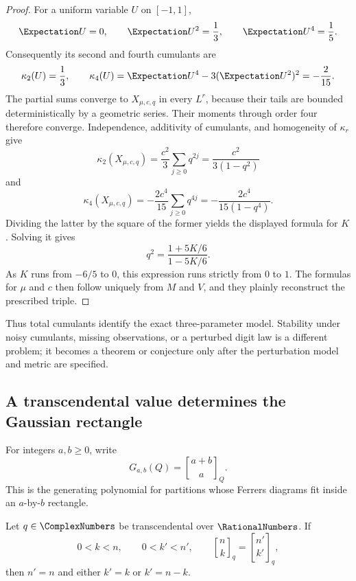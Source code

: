\begin{proof}
For a uniform variable \(U\) on \([-1,1]\),
\[
 \Expectation U=0,\qquad
 \Expectation U^2=\frac13,\qquad
 \Expectation U^4=\frac15.
\]
Consequently its second and fourth cumulants are
\[
 \kappa_2(U)=\frac13,\qquad
 \kappa_4(U)=\Expectation U^4-3(\Expectation U^2)^2=-\frac{2}{15}.
\]
The partial sums converge to \(X_{\mu,c,q}\) in every \(L^r\), because their
tails are bounded deterministically by a geometric series.  Their moments
through order four therefore converge.  Independence, additivity of
cumulants, and homogeneity of \(\kappa_r\) give
\[
 \kappa_2(X_{\mu,c,q})
  =\frac{c^2}{3}\sum_{j\ge0}q^{2j}
  =\frac{c^2}{3(1-q^2)}
\]
and
\[
 \kappa_4(X_{\mu,c,q})
  =-\frac{2c^4}{15}\sum_{j\ge0}q^{4j}
  =-\frac{2c^4}{15(1-q^4)}.
\]
Dividing the latter by the square of the former yields the displayed formula
for \(K\).  Solving it gives
\[
 q^2=\frac{1+5K/6}{1-5K/6}.
\]
As \(K\) runs from \(-6/5\) to \(0\), this expression runs strictly from
\(0\) to \(1\).  The formulas for \(\mu\) and \(c\) then follow uniquely from
\(M\) and \(V\), and they plainly reconstruct the prescribed triple.
\end{proof}

Thus total cumulants identify the exact three-parameter model.  Stability
under noisy cumulants, missing observations, or a perturbed digit law is a
different problem; it becomes a theorem or conjecture only after the
perturbation model and metric are specified.

\subsection{A transcendental value determines the Gaussian rectangle}

For integers \(a,b\ge0\), write
\[
 G_{a,b}(Q)=\genfrac{[}{]}{0pt}{}{a+b}{a}_{Q}.
\]
This is the generating polynomial for partitions whose Ferrers diagrams fit
inside an \(a\)-by-\(b\) rectangle.

\begin{theorem}
\label{thm:transcendental-gaussian-uniqueness}
Let \(q\in\ComplexNumbers\) be transcendental over \(\RationalNumbers\).  If
\[
 0<k<n,\qquad 0<k'<n',\qquad
 \genfrac{[}{]}{0pt}{}{n}{k}_{q}
   =\genfrac{[}{]}{0pt}{}{n'}{k'}_{q},
\]
then \(n'=n\) and either \(k'=k\) or \(k'=n-k\).
\end{theorem}

